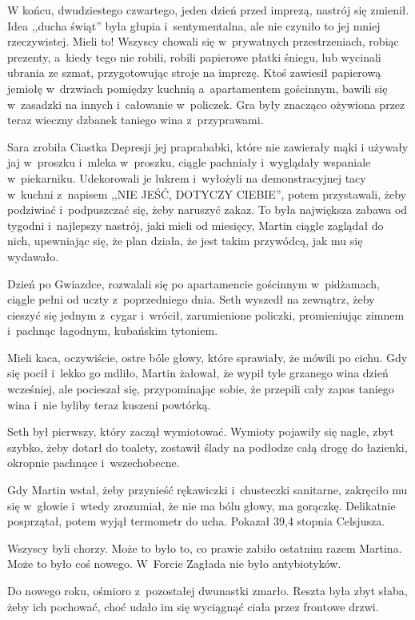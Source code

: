 \documentclass[oneside,polish,11pt,sfheadings]{mwbk}
\begin{document}
W końcu, dwudziestego czwartego, jeden dzień przed imprezą, nastrój się
zmienił. Idea ,,ducha świąt'' była głupia i~sentymentalna, ale nie
czyniło to jej mniej rzeczywistej. Mieli to! Wszyscy chowali się w~prywatnych przestrzeniach, robiąc prezenty, a~kiedy tego nie robili,
robili papierowe płatki śniegu, lub wycinali ubrania ze szmat,
przygotowując stroje na imprezę. Ktoś zawiesił papierową jemiołę w~drzwiach pomiędzy kuchnią a~apartamentem gościnnym, bawili się w~zasadzki na innych i~całowanie w~policzek. Gra były znacząco ożywiona
przez teraz wieczny dzbanek taniego wina z~przyprawami.

Sara zrobiła Ciastka Depresji jej praprababki, które nie zawierały mąki
i używały jaj w~proszku i~mleka w~proszku, ciągle pachniały i~wyglądały
wspaniale w~piekarniku. Udekorowali je lukrem i~wyłożyli na
demonstracyjnej tacy w~kuchni z~napisem ,,NIE JEŚĆ, DOTYCZY CIEBIE'',
potem przystawali, żeby podziwiać i~podpuszczać się, żeby naruszyć
zakaz. To była największa zabawa od tygodni i~najlepszy nastrój, jaki
mieli od miesięcy, Martin ciągle zaglądał do nich, upewniając się, że
plan działa, że jest takim przywódcą, jak mu się wydawało.

Dzień po Gwiazdce, rozwalali się po apartamencie gościnnym w~pidżamach,
ciągle pełni od uczty z~poprzedniego dnia. Seth wyszedł na zewnątrz,
żeby cieszyć się jednym z~cygar i~wrócił, zarumienione policzki,
promieniując zimnem i~pachnąc łagodnym, kubańskim tytoniem.

Mieli kaca, oczywiście, ostre bóle głowy, które sprawiały, że mówili po
cichu. Gdy się pocił i~lekko go mdliło, Martin żałował, że wypił tyle
grzanego wina dzień wcześniej, ale pocieszał się, przypominając sobie,
że przepili cały zapas taniego wina i~nie byliby teraz kuszeni powtórką.

Seth był pierwszy, który zaczął wymiotować. Wymioty pojawiły się nagle,
zbyt szybko, żeby dotarł do toalety, zostawił ślady na podłodze całą
drogę do łazienki, okropnie pachnące i~wszechobecne.

Gdy Martin wstał, żeby przynieść rękawiczki i~chusteczki sanitarne,
zakręciło mu się w~głowie i~wtedy zrozumiał, że nie ma bólu głowy, ma
gorączkę. Delikatnie posprzątał, potem wyjął termometr do ucha. Pokazał
39,4 stopnia Celsjusza.

Wszyscy byli chorzy. Może to było to, co prawie zabiło ostatnim razem
Martina. Może to było coś nowego. W~Forcie Zagłada nie było
antybiotyków.

Do nowego roku, ośmioro z~pozostałej dwunastki zmarło. Reszta była zbyt
słaba, żeby ich pochować, choć udało im się wyciągnąć ciała przez
frontowe drzwi.
\end{document}
